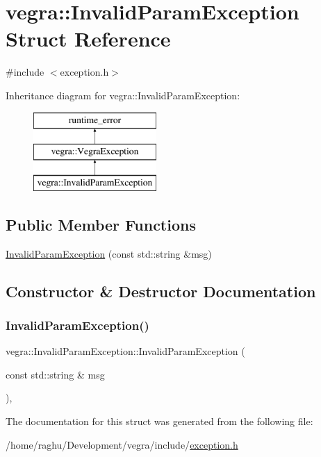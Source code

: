 \hypertarget{structvegra_1_1InvalidParamException}{}\section{vegra\+:\+:Invalid\+Param\+Exception Struct Reference}
\label{structvegra_1_1InvalidParamException}


{\ttfamily \#include $<$exception.\+h$>$}

Inheritance diagram for vegra\+:\+:Invalid\+Param\+Exception\+:\begin{figure}[H]
\begin{center}
\leavevmode
\includegraphics[height=3.000000cm]{structvegra_1_1InvalidParamException}
\end{center}
\end{figure}
\subsection*{Public Member Functions}
\begin{DoxyCompactItemize}
\item 
\mbox{\hyperlink{structvegra_1_1InvalidParamException_a53ef0c110a6dbcfacf38870798dafba5}{Invalid\+Param\+Exception}} (const std\+::string \&msg)
\end{DoxyCompactItemize}


\subsection{Constructor \& Destructor Documentation}
\mbox{\label{structvegra_1_1InvalidParamException_a53ef0c110a6dbcfacf38870798dafba5}} 
\subsubsection{\texorpdfstring{Invalid\+Param\+Exception()}{InvalidParamException()}}
{\footnotesize\ttfamily vegra\+::\+Invalid\+Param\+Exception\+::\+Invalid\+Param\+Exception (\begin{DoxyParamCaption}\item[{const std\+::string \&}]{msg }\end{DoxyParamCaption})\hspace{0.3cm}{\ttfamily [inline]}, {\ttfamily [explicit]}}



The documentation for this struct was generated from the following file\+:\begin{DoxyCompactItemize}
\item 
/home/raghu/\+Development/vegra/include/\mbox{\hyperlink{exception_8h}{exception.\+h}}\end{DoxyCompactItemize}
